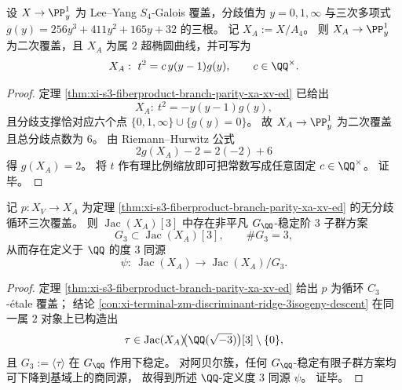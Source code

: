 \begin{theorem}\label{thm:conclusion-leyang-xa-genus2-hyperelliptic-model}
设 \(X\to \PP^1_y\) 为 Lee--Yang \(S_4\)-Galois 覆盖，分歧值为
\(
y=0,1,\infty
\)
与三次多项式
\(
g(y)=256y^3+411y^2+165y+32
\)
的三根。
记 \(X_A:=X/A_4\)。
则 \(X_A\to \PP^1_y\) 为二次覆盖，且 \(X_A\) 为属 \(2\) 超椭圆曲线，并可写为
\[
X_A:\ t^2=c\,y(y-1)g(y),\qquad c\in\QQ^\times.
\]
\end{theorem}
\begin{proof}
定理 \ref{thm:xi-s3-fiberproduct-branch-parity-xa-xv-ed} 已给出
\[
X_A:\ t^2=-y(y-1)g(y),
\]
且分歧支撑恰对应六个点
\(
\{0,1,\infty\}\cup\{g(y)=0\}
\)。
故 \(X_A\to\PP^1_y\) 为二次覆盖且总分歧点数为 \(6\)。
由 Riemann--Hurwitz 公式
\[
2g(X_A)-2=2(-2)+6
\]
得 \(g(X_A)=2\)。
将 \(t\) 作有理比例缩放即可把常数写成任意固定 \(c\in\QQ^\times\)。
证毕。
\end{proof}

\begin{proposition}\label{prop:conclusion-leyang-xa-c3-subgroup-descent}
记 \(p:X_V\to X_A\) 为定理 \ref{thm:xi-s3-fiberproduct-branch-parity-xa-xv-ed} 的无分歧循环三次覆盖。
则 \(\operatorname{Jac}(X_A)[3]\) 中存在非平凡 \(G_{\QQ}\)-稳定阶 \(3\) 子群方案
\[
G_3\subset \operatorname{Jac}(X_A)[3],\qquad \#G_3=3,
\]
从而存在定义于 \(\QQ\) 的度 \(3\) 同源
\[
\psi:\ \operatorname{Jac}(X_A)\longrightarrow \operatorname{Jac}(X_A)/G_3.
\]
\end{proposition}
\begin{proof}
定理 \ref{thm:xi-s3-fiberproduct-branch-parity-xa-xv-ed} 给出 \(p\) 为循环 \(C_3\)-étale 覆盖；
结论 \ref{con:xi-terminal-zm-discriminant-ridge-3isogeny-descent} 在同一属 \(2\) 对象上已构造出
\[
\tau\in \operatorname{Jac}(X_A)\!\bigl(\QQ(\sqrt{-3})\bigr)[3]\setminus\{0\},
\]
且 \(G_3:=\langle\tau\rangle\) 在 \(G_{\QQ}\) 作用下稳定。
对阿贝尔簇，任何 \(G_{\QQ}\)-稳定有限子群方案均可下降到基域上的商同源，
故得到所述 \(\QQ\)-定义度 \(3\) 同源 \(\psi\)。
证毕。
\end{proof}

